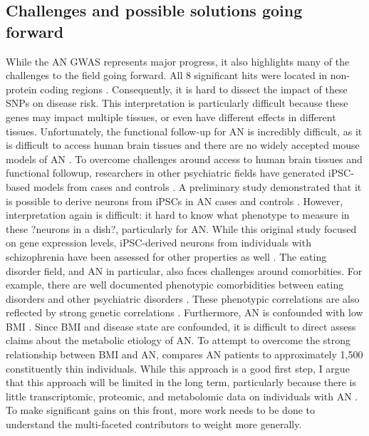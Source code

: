 \subsection{Challenges and possible solutions going forward}
While the AN GWAS represents major progress, it also highlights many of the challenges to the field going forward. All 8 significant hits were located in non-protein coding regions \cite{RN4115}. Consequently, it is hard to dissect the impact of these SNPs on disease risk. This interpretation is particularly difficult because these genes may impact multiple tissues, or even have different effects in different tissues. Unfortunately, the functional follow-up for AN is incredibly difficult, as it is difficult to access human brain tissues and there are no widely accepted mouse models of AN \cite{RN1060}.  
To overcome challenges around access to human brain tissues and functional followup, 
researchers in other psychiatric fields have generated iPSC-based models from cases and controls \cite{RN2029, RN2026}. A preliminary study demonstrated that it is possible to derive neurons from iPSCs in AN cases and controls \cite{RN2030}. However, interpretation again is difficult: it hard to know what phenotype to measure in these ?neurons in a dish?, particularly for AN. While this original study focused on gene expression levels, iPSC-derived neurons from individuals with schizophrenia have been assessed for other properties as well \cite{RN2022}. 
	The eating disorder field, and AN in particular, also faces challenges around comorbities. For example, there are well documented phenotypic comorbidities between eating disorders and other psychiatric disorders \cite{RN34}. These phenotypic correlations are also reflected by strong genetic correlations \cite{RN4568}. Furthermore, AN is confounded with low BMI \cite{RN4522}. Since BMI and disease state are confounded, it is difficult to direct assess claims about the metabolic etiology of AN. To attempt to overcome the strong relationship between BMI and AN, \cite{RN4568} compares AN patients to approximately 1,500 constituently thin individuals. While this approach is a good first step, I argue that this approach will be limited in the long term, particularly because there is little transcriptomic, proteomic, and metabolomic data on individuals with AN \cite{RN1411}. To make significant gains on this front, more work needs to be done to understand the multi-faceted contributors to weight more generally.  
